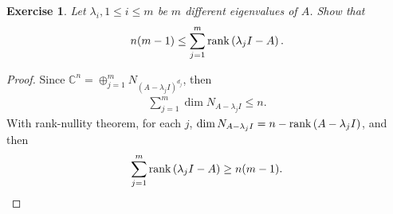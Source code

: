 \documentclass[11pt]{book}
\newtheorem{exercise}{Exercise}[section]
\theoremstyle{definition}
\numberwithin{equation}{chapter}
\begin{document}
\medskip

\begin{exercise}
Let $\lambda_i, 1 \leq i \leq m$ be $m$ different eigenvalues of $A$. Show that
\begin{align*}
    n(m - 1) \leq \sum^m_{j=1} \rank \left(\lambda_j I - A\right).
\end{align*}
\end{exercise}
\begin{proof}
Since $\mathbb{C}^n = \oplus^m_{j=1} N_{\left(A - \lambda_j I\right)^{d_j}}$, then 
\begin{align*}
    \sum^m_{j=1} \dim N_{A - \lambda_j I} \leq n.
\end{align*}
With rank-nullity theorem, for each $j$, $\dim N_{A - \lambda_j I} = n - \rank \left(A - \lambda_j I\right)$, and then
\begin{align*}
    \sum^m_{j=1} \rank \left(\lambda_j I - A\right) \geq n(m - 1).
\end{align*}
\end{proof}

\medskip
\end{document}
